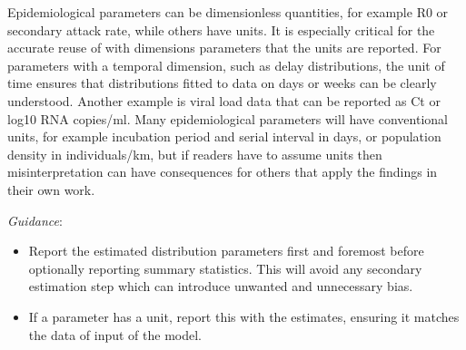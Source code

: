 \documentclass[
  10pt,
  letterpaper,
]{article}
\providecommand{\tightlist}{%
  \setlength{\itemsep}{0pt}\setlength{\parskip}{0pt}}\usepackage{longtable,booktabs,array}
\begin{document}
Epidemiological parameters can be dimensionless quantities, for example
R0 or secondary attack rate, while others have units. It is especially
critical for the accurate reuse of with dimensions parameters that the
units are reported. For parameters with a temporal dimension, such as
delay distributions, the unit of time ensures that distributions fitted
to data on days or weeks can be clearly understood. Another example is
viral load data that can be reported as Ct or log10 RNA copies/ml. Many
epidemiological parameters will have conventional units, for example
incubation period and serial interval in days, or population density in
individuals/km, but if readers have to assume units then
misinterpretation can have consequences for others that apply the
findings in their own work.

\emph{Guidance}:

\begin{itemize}
\tightlist
\item
  Report the estimated distribution parameters first and foremost before
  optionally reporting summary statistics. This will avoid any secondary
  estimation step which can introduce unwanted and unnecessary bias.
\item
  If a parameter has a unit, report this with the estimates, ensuring it
  matches the data of input of the model.
\end{itemize}
\end{document}
